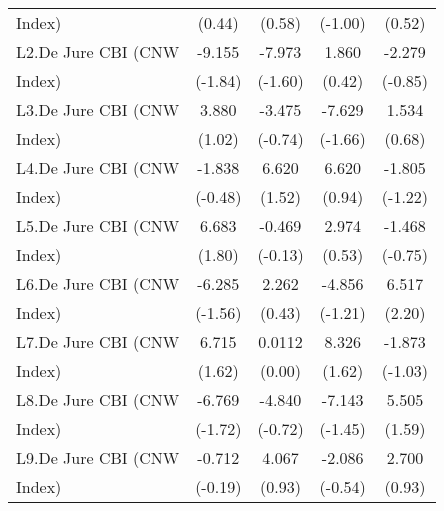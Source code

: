 {\begin{tabular}{l*{4}{c}}
Index)              &      (0.44)         &      (0.58)         &     (-1.00)         &      (0.52)         \\
[1em]
L2.De Jure CBI (CNW &      -9.155         &      -7.973         &       1.860         &      -2.279         \\
Index)              &     (-1.84)         &     (-1.60)         &      (0.42)         &     (-0.85)         \\
[1em]
L3.De Jure CBI (CNW &       3.880         &      -3.475         &      -7.629         &       1.534         \\
Index)              &      (1.02)         &     (-0.74)         &     (-1.66)         &      (0.68)         \\
[1em]
L4.De Jure CBI (CNW &      -1.838         &       6.620         &       6.620         &      -1.805         \\
Index)              &     (-0.48)         &      (1.52)         &      (0.94)         &     (-1.22)         \\
[1em]
L5.De Jure CBI (CNW &       6.683         &      -0.469         &       2.974         &      -1.468         \\
Index)              &      (1.80)         &     (-0.13)         &      (0.53)         &     (-0.75)         \\
[1em]
L6.De Jure CBI (CNW &      -6.285         &       2.262         &      -4.856         &       6.517\sym{*}  \\
Index)              &     (-1.56)         &      (0.43)         &     (-1.21)         &      (2.20)         \\
[1em]
L7.De Jure CBI (CNW &       6.715         &      0.0112         &       8.326         &      -1.873         \\
Index)              &      (1.62)         &      (0.00)         &      (1.62)         &     (-1.03)         \\
[1em]
L8.De Jure CBI (CNW &      -6.769         &      -4.840         &      -7.143         &       5.505         \\
Index)              &     (-1.72)         &     (-0.72)         &     (-1.45)         &      (1.59)         \\
[1em]
L9.De Jure CBI (CNW &      -0.712         &       4.067         &      -2.086         &       2.700         \\
Index)              &     (-0.19)         &      (0.93)         &     (-0.54)         &      (0.93)         \\

\end{tabular}}
